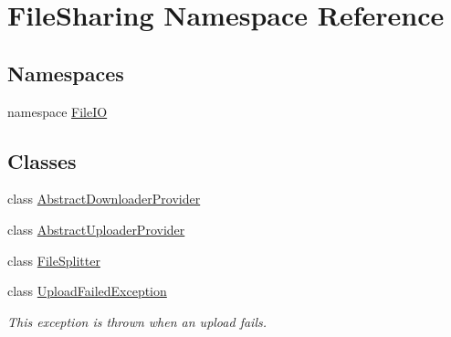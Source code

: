 \hypertarget{namespace_file_sharing}{}\section{File\+Sharing Namespace Reference}
\label{namespace_file_sharing}
\subsection*{Namespaces}
\begin{DoxyCompactItemize}
\item 
namespace \hyperlink{namespace_file_sharing_1_1_file_i_o}{File\+IO}
\end{DoxyCompactItemize}
\subsection*{Classes}
\begin{DoxyCompactItemize}
\item 
class \hyperlink{class_file_sharing_1_1_abstract_downloader_provider}{Abstract\+Downloader\+Provider}
\item 
class \hyperlink{class_file_sharing_1_1_abstract_uploader_provider}{Abstract\+Uploader\+Provider}
\item 
class \hyperlink{class_file_sharing_1_1_file_splitter}{File\+Splitter}
\item 
class \hyperlink{class_file_sharing_1_1_upload_failed_exception}{Upload\+Failed\+Exception}
\begin{DoxyCompactList}\small\item\em This exception is thrown when an upload fails. \end{DoxyCompactList}\end{DoxyCompactItemize}
